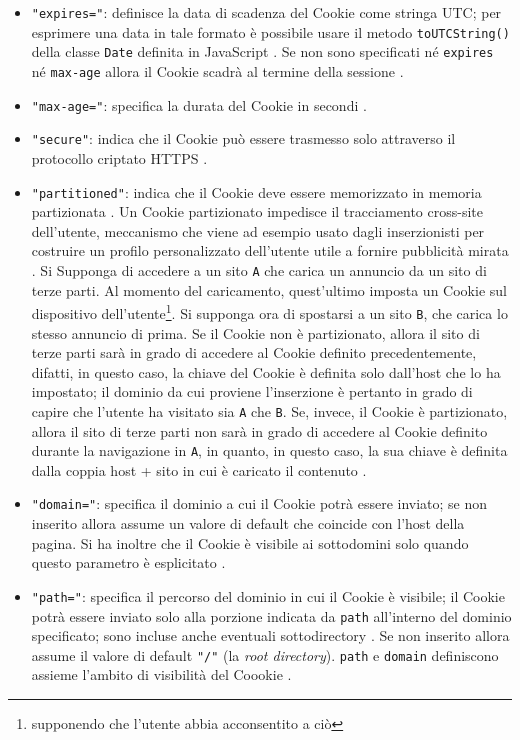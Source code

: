 \documentclass[a4paper, 12pt, twoside, openright]{book}
\begin{document}
\begin{itemize}
\item\texttt{"expires="}: definisce la data di scadenza del Cookie come stringa UTC; per esprimere una data in tale formato è possibile usare il metodo \texttt{toUTCString()} della classe \texttt{Date} definita in JavaScript \cite{MDN_Web_docs:cookies}. Se non sono specificati né \texttt{expires} né \texttt{max-age} allora il Cookie scadrà al termine della sessione \cite{MDN_Web_docs:cookies}.
\item\texttt{"max-age="}: specifica la durata del Cookie in secondi \cite{MDN_Web_docs:cookies}.
\item\texttt{"secure"}: indica che il Cookie può essere trasmesso solo attraverso il protocollo criptato HTTPS \cite{MDN_Web_docs:cookies}.
\item\texttt{"partitioned"}: indica che il Cookie deve essere memorizzato in memoria partizionata \cite{MDN_Web_docs:cookies}. Un Cookie partizionato impedisce il tracciamento cross-site dell'utente, meccanismo che viene ad esempio usato dagli inserzionisti per costruire un profilo personalizzato dell'utente utile a fornire pubblicità mirata \cite{MDN_Web_docs:CHIPS}. Si Supponga di accedere a un sito \texttt{A} che carica un annuncio da un sito di terze parti. Al momento del caricamento, quest'ultimo imposta un Cookie sul dispositivo dell'utente\footnote{supponendo che l'utente abbia acconsentito a ciò}. Si supponga ora di spostarsi a un sito \texttt{B}, che carica lo stesso annuncio di prima. Se il Cookie non è partizionato, allora il sito di terze parti sarà in grado di accedere al Cookie definito precedentemente, difatti, in questo caso, la chiave del Cookie è definita solo dall'host che lo ha impostato; il dominio da cui proviene l'inserzione è pertanto in grado di capire che l'utente ha visitato sia \texttt{A} che \texttt{B}. Se, invece, il Cookie è partizionato, allora il sito di terze parti non sarà in grado di accedere al Cookie definito durante la navigazione in \texttt{A}, in quanto, in questo caso, la sua chiave è definita dalla coppia host + sito in cui è caricato il contenuto \cite{MDN_Web_docs:CHIPS}.
\item\texttt{"domain="}: specifica il dominio a cui il Cookie potrà essere inviato; se non inserito allora assume un valore di default che coincide con l'host della pagina. Si ha inoltre che il Cookie è visibile ai sottodomini solo quando questo parametro è esplicitato \cite{MDN_Web_docs:cookies}.
\item\texttt{"path="}: specifica il percorso del dominio in cui il Cookie è visibile; il Cookie potrà essere inviato solo alla porzione indicata da \texttt{path} all'interno del dominio specificato; sono incluse anche eventuali sottodirectory \cite{MDN_Web_docs:HTTP_cookies}. Se non inserito allora assume il valore di default \texttt{"/"} (la \textit{root directory}). \texttt{path} e \texttt{domain} definiscono assieme l'ambito di visibilità del Coookie \cite{Wiki:cookies}.

\end{itemize}
\end{document}
